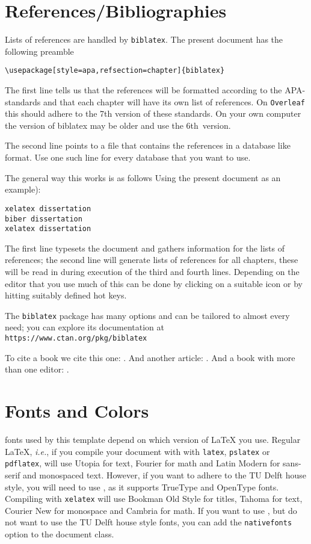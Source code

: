 \section{References/Bibliographies}

Lists of references are handled by \texttt{biblatex}.
The present document has the following preamble
\begin{verbatim}
\usepackage[style=apa,refsection=chapter]{biblatex}

\end{verbatim}
The first line tells us that the references will be formatted according to 
the APA-standards and that each chapter will have its own list of references.
On \texttt{Overleaf} this should adhere to the 7th version of these 
standards.
On your own computer the version of biblatex may be older and 
use the 6th~version.

The second line points to a file that contains the references in a database
like format.
Use one such line for every database that you want to use.

The general way this works is as follows Using the present document as 
an example):
\begin{verbatim}
xelatex dissertation
biber dissertation
xelatex dissertation
\end{verbatim}
The first line typesets the document and gathers information for the lists
of references; the second line will generate lists of references for all 
chapters, these will be read in during execution of the third and fourth lines.
Depending on the editor that you use much of this can be done by clicking
on a suitable icon or by hitting suitably defined hot keys.

The \texttt{biblatex} package has many options and can be tailored to almost
every need; you can explore its documentation at
\texttt{https://www.ctan.org/pkg/biblatex}

To cite a book we cite this one: \cite{MR1039321}.
And another article: \cite{MR3860876}.
And a book with more than one editor: \cite{MR3204729}.




\section{Fonts and Colors}

 fonts used by this template depend on which version of \LaTeX{} you use. Regular \LaTeX, \emph{i.e.}, if you compile your document with with \texttt{latex}, \texttt{pslatex} or \texttt{pdflatex}, will use Utopia for text, Fourier for math and Latin Modern for sans-serif and monospaced text. However, if you want to adhere to the TU Delft house style, you will need to use \XeLaTeX, as it supports TrueType and OpenType fonts. Compiling with \texttt{xelatex} will use Bookman Old Style for titles, Tahoma for text, Courier New for monospace and Cambria for math. If you want to use \XeLaTeX, but do not want to use the TU Delft house style fonts, you can add the \texttt{nativefonts} option to the document class.

